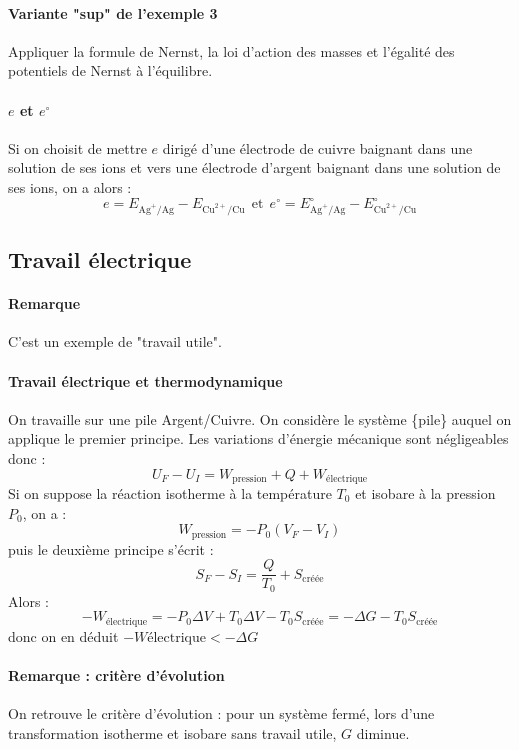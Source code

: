 \documentclass[french]{book}
\theoremstyle{plain}
\theoremstyle{definition}
\theoremstyle{remark}
\begin{document}
\paragraph{Variante "sup" de l'exemple 3} Appliquer la formule de Nernst, la loi d'action des masses et l'égalité des potentiels de Nernst à l'équilibre.

\paragraph{$e$ et $e^\circ$} Si on choisit de mettre $e$ dirigé d'une électrode de cuivre baignant dans une solution de ses ions et vers une électrode d'argent baignant dans une solution de ses ions, on a alors : $$e=E_{\text{Ag}^+/\text{Ag}}-E_{\text{Cu}^{2+}/\text{Cu}}\ \ \text{et}\ \ e^\circ=E_{\text{Ag}^+/\text{Ag}}^\circ-E_{\text{Cu}^{2+}/\text{Cu}}^\circ$$

\subsection{Travail électrique}

\paragraph{Remarque} C'est un exemple de "travail utile".

\paragraph{Travail électrique et thermodynamique} On travaille sur une pile Argent/Cuivre. On considère le système \{pile\} auquel on applique le premier principe. Les variations d'énergie mécanique sont négligeables donc : $$U_F-U_I=W_{\text{pression}}+Q+W_{\text{électrique}}$$ Si on suppose la réaction isotherme à la température $T_0$ et isobare à la pression $P_0$, on a : $$W_\text{pression}=-P_0(V_F-V_I)$$ puis le deuxième principe s'écrit : $$S_F-S_I=\frac{Q}{T_0}+S_\text{créée}$$ Alors : $$-W_\text{électrique}=-P_0\Delta V+T_0\Delta V-T_0S_\text{créée}=-\Delta G-T_0S_\text{créée}$$ donc on en déduit $-W\text{électrique}<-\Delta G$

\paragraph{Remarque : critère d'évolution} On retrouve le critère d'évolution : pour un système fermé, lors d'une transformation isotherme et isobare sans travail utile, $G$ diminue.
\end{document}
